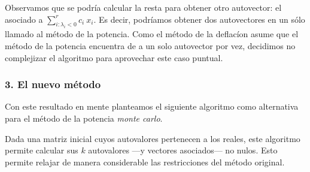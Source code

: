 \vspace{1em}

\vspace{1em}
Observamos que se podría calcular la resta para obtener otro autovector: el asociado a $\sum_{i: \lambda_i < 0}^{r} c_i\ x_i$. Es decir, podríamos obtener dos autovectores en un sólo llamado al método de la potencia. Como el método de la deflacíon asume que el método de la potencia encuentra de a un solo autovector por vez, decidimos no complejizar el algoritmo para aprovechar este caso puntual.





\vspace{2em}
\subsubsection*{3. El nuevo método} Con este resultado en mente planteamos el siguiente algoritmo como alternativa para el método de la potencia \textit{monte carlo}.

\vspace{1em}


\vspace{1em}
Dada una matriz inicial cuyos autovalores pertenecen a los reales, este algoritmo permite calcular sus $k$ autovalores ---y vectores asociados--- no nulos. Esto permite relajar de manera considerable las restricciones del método original.
